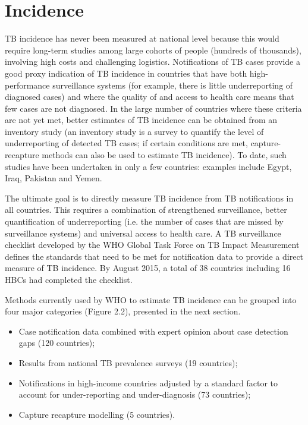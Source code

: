 \section{Incidence}

TB incidence has never been measured at national level because this would require long-term studies among large cohorts of people (hundreds of thousands), involving high costs and challenging logistics. Notifications of TB cases provide a good proxy indication of TB incidence in countries that have both high-performance surveillance systems (for example, there is little underreporting of diagnosed cases) and where the quality of and access to health care means that few cases are not diagnosed. In the large number of countries where these criteria are not yet met, better estimates of TB incidence can be obtained from an inventory study\cite{WHO2012} (an inventory study is a survey to quantify the level of underreporting of detected TB cases; if certain conditions are met, capture-recapture methods can also be used to estimate TB incidence). To date, such studies have been undertaken in only a few countries: examples include Egypt, Iraq, Pakistan and Yemen. 

The ultimate goal is to directly measure TB incidence from TB notifications in all countries. This requires a combination of strengthened surveillance, better quantification of underreporting (i.e. the number of cases that are missed by surveillance systems) and universal access to health care. A TB surveillance checklist developed by the WHO Global Task Force on TB Impact Measurement defines the standards that need to be met for notification data to provide a direct measure of TB incidence. By August 2015, a total of 38 countries including 16 HBCs had completed the checklist. 

Methods currently used by WHO to estimate TB incidence can be grouped into four major categories (Figure 2.2), presented in the next section. 

\begin{itemize}
\item Case notification data combined with expert opinion about case detection gaps (120 countries);
\item Results from national TB prevalence surveys (19 countries);
\item Notifications in high-income countries adjusted by a standard factor to account for under-reporting and under-diagnosis (73 countries);
\item Capture recapture modelling (5 countries).
\end{itemize}






  
  
  
  
  
  
  
  
  
  